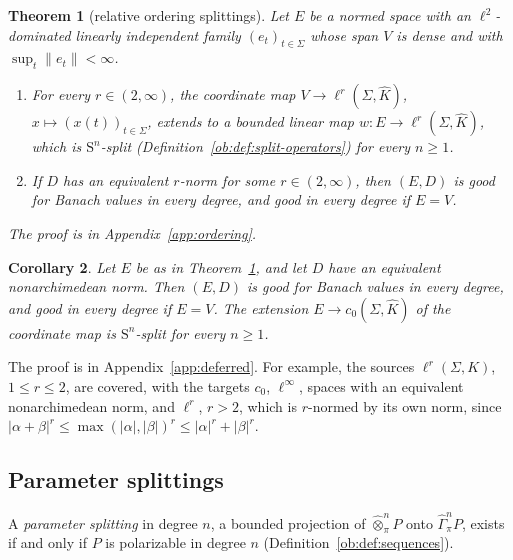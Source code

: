 \documentclass[11pt]{amsart}
\newtheorem{theorem}{Theorem}[section]
\newtheorem{corollary}[theorem]{Corollary}
\theoremstyle{definition}
\theoremstyle{remark}
\numberwithin{equation}{section}
\newcommand{\linf}{\ell^\infty}
\newcommand{\abs}[1]{\lvert #1\rvert}
\newcommand{\norm}[1]{\lVert #1\rVert}
\theoremstyle{plain}
\theoremstyle{definition}
\theoremstyle{plain}
\begin{document}
\begin{theorem}[relative ordering splittings]\label{spl:thm:relative-ordering}
Let $E$ be a normed space with an $\ell^2$-dominated linearly independent family $(e_t)_{t\in\Sigma}$ whose span $V$ is
dense and with $\sup_t\norm{e_t}<\infty$.
\begin{enumerate}
\item For every $r\in(2,\infty)$, the coordinate map $V\to\ell^r(\Sigma,\widehat K)$, $x\mapsto(x(t))_{t\in\Sigma}$,
extends to a bounded linear map $w\colon E\to\ell^r(\Sigma,\widehat K)$, which is $\mathrm S^n$-split
(Definition~\ref{ob:def:split-operators}) for every $n\ge1$.
\item If $D$ has an equivalent $r$-norm for some $r\in(2,\infty)$, then $(E,D)$ is good for Banach values in every degree,
and good in every degree if $E=V$.
\end{enumerate}
The proof is in Appendix~\ref{app:ordering}.
\end{theorem}

\begin{corollary}\label{spl:cor:relative-ordering-na}
Let $E$ be as in Theorem~\ref{spl:thm:relative-ordering}, and let $D$ have an equivalent nonarchimedean norm. Then
$(E,D)$ is good for Banach values in every degree, and good in every degree if $E=V$. The extension
$E\to c_0(\Sigma,\widehat K)$ of the coordinate map is $\mathrm S^n$-split for every $n\ge1$.
\end{corollary}

The proof is in Appendix~\ref{app:deferred}. For example, the sources $\ell^r(\Sigma,K)$, $1\le r\le2$, are covered, with the targets $c_0$, $\linf$, spaces with an
equivalent nonarchimedean norm, and $\ell^r$, $r>2$, which is $r$-normed by its own norm, since
$\abs{\alpha+\beta}^r\le\max(\abs\alpha,\abs\beta)^r\le\abs\alpha^r+\abs\beta^r$.

\subsection{Parameter splittings}\label{spl:ssec:parameter}

A \emph{parameter splitting} in degree $n$, a bounded projection of $\widehat\otimes^n_\pi P$ onto $\widehat\Gamma^n_\pi P$,
exists if and only if $P$ is polarizable in degree $n$ (Definition~\ref{ob:def:sequences}).
\end{document}
